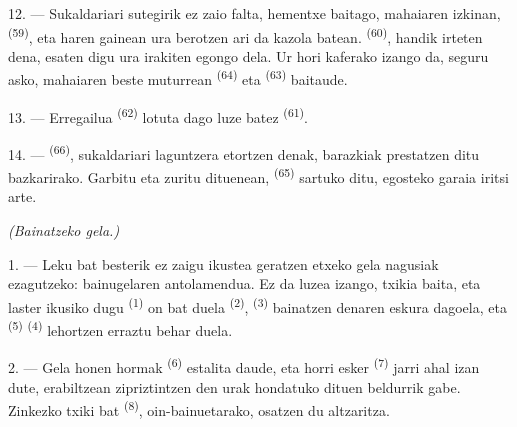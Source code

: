 12. --- Sukaldariari sutegirik ez zaio falta, hementxe baitago, mahaiaren
izkinan,  \textsuperscript{(59)}, eta haren gainean ura
berotzen ari da kazola batean.  \textsuperscript{(60)}, handik
irteten dena, esaten digu ura irakiten egongo dela. Ur hori kaferako izango da,
seguru asko, mahaiaren beste muturrean 
\textsuperscript{(64)} eta  \textsuperscript{(63)} baitaude.

13. --- Erregailua  \textsuperscript{(62)} lotuta dago
 luze batez \textsuperscript{(61)}.

14. ---  \textsuperscript{(66)}, sukaldariari laguntzera
etortzen denak, barazkiak prestatzen ditu bazkarirako. Garbitu eta zuritu
dituenean,  \textsuperscript{(65)} sartuko ditu, egosteko garaia
iritsi arte.

\VUsaut{4.0mm}
{\centering\fontsize{10.2pt}{10.2pt}\selectfont{} \textit{(Bainatzeko gela.)}\par}
\VUsaut{3.0mm}

1. --- Leku bat besterik ez zaigu ikustea geratzen etxeko gela nagusiak
ezagutzeko: bainugelaren antolamendua. Ez da luzea izango, txikia baita, eta
laster ikusiko dugu  \textsuperscript{(1)}
 on bat duela \textsuperscript{(2)}, 
\textsuperscript{(3)} bainatzen denaren eskura dagoela, eta 
\textsuperscript{(5)}  \textsuperscript{(4)} lehortzen
erraztu behar duela.

2. --- Gela honen hormak  \textsuperscript{(6)} estalita
daude, eta horri esker  \textsuperscript{(7)} jarri ahal izan dute,
erabiltzean zipriztintzen den urak hondatuko dituen beldurrik gabe. Zinkezko
 txiki bat \textsuperscript{(8)}, oin-bainuetarako, osatzen du
altzaritza.
\VUsaut{6.0mm}
\VUfilet{22mm}
